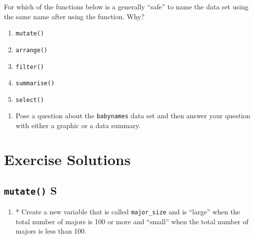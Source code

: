 \documentclass[
]{book}
\providecommand{\tightlist}{%
  \setlength{\itemsep}{0pt}\setlength{\parskip}{0pt}}
\begin{document}
For which of the functions below is a generally ``safe'' to name the data set using the same name after using the function. Why?

\begin{enumerate}
\def\labelenumi{\alph{enumi}.}
\item
  \texttt{mutate()}
\item
  \texttt{arrange()}
\item
  \texttt{filter()}
\item
  \texttt{summarise()}
\item
  \texttt{select()}
\end{enumerate}

\begin{enumerate}
\def\labelenumi{\arabic{enumi}.}
\setcounter{enumi}{4}
\tightlist
\item
  Pose a question about the \texttt{babynames} data set and then answer your question with either a graphic or a data summary.
\end{enumerate}

\hypertarget{solutions-3}{%
\section{Exercise Solutions}\label{solutions-3}}

\hypertarget{mutate-s}{%
\subsection{\texorpdfstring{\texttt{mutate()} S}{mutate() S}}\label{mutate-s}}

\begin{enumerate}
\def\labelenumi{\arabic{enumi}.}
\setcounter{enumi}{1}
\tightlist
\item
  * Create a new variable that is called \texttt{major\_size} and is ``large'' when the total number of majors is 100 or more and ``small'' when the total number of majors is less than 100.
\end{enumerate}
\end{document}
